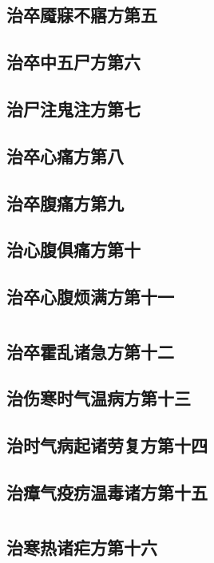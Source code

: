 \documentclass[12pt,UTF8]{ctexbook}
\begin{document}
\chapter{治卒魇寐不寤方第五}
\chapter{治卒中五尸方第六}
\chapter{治尸注鬼注方第七}
\chapter{治卒心痛方第八}
\chapter{治卒腹痛方第九}
\chapter{治心腹俱痛方第十}
\chapter{治卒心腹烦满方第十一}

\part{}

\chapter{治卒霍乱诸急方第十二}
\chapter{治伤寒时气温病方第十三}
\chapter{治时气病起诸劳复方第十四}
\chapter{治瘴气疫疠温毒诸方第十五}

\part{}

\chapter{治寒热诸疟方第十六}
\end{document}
